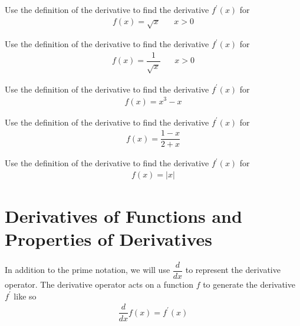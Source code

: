 \begin{exercise}
Use the definition of the derivative to find the derivative $f^{'}(x)$ for
\begin{align*}
    f(x) = \sqrt{x} \hspace{20pt} x > 0
\end{align*}
\end{exercise}

\begin{exercise}
Use the definition of the derivative to find the derivative $f^{'}(x)$ for
\begin{align*}
    f(x) = \dfrac{1}{\sqrt{x}} \hspace{20pt} x > 0
\end{align*}
\end{exercise}

\begin{exercise}
Use the definition of the derivative to find the derivative $f^{'}(x)$ for
\begin{align*}
    f(x) = x^{3} - x
\end{align*}
\end{exercise}

\begin{exercise}
Use the definition of the derivative to find the derivative $f^{'}(x)$ for
\begin{align*}
    f(x) = \dfrac{1-x}{2+x}
\end{align*}
\end{exercise}

\begin{exercise}
Use the definition of the derivative to find the derivative $f^{'}(x)$ for
\begin{align*}
    f(x) = \lvert x \rvert
\end{align*}
\end{exercise}

\newpage
\section{Derivatives of Functions and Properties of Derivatives}

\begin{note}
In addition to the prime notation, we will use $\dfrac{d}{dx}$ to represent the derivative operator. The derivative operator acts on a function $f$ to generate the derivative $f^{'}$ like so
\begin{align*}
    \dfrac{d}{dx}f(x) = f^{'}(x)
\end{align*}
\end{note}

